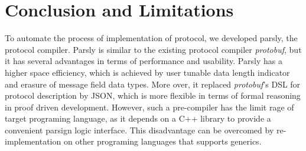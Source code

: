 \documentclass{article}
\begin{document}
\section{Conclusion and Limitations} %
To automate the process of implementation of protocol, we developed parsly, the protocol compiler. Parsly is similar to the existing protocol compiler \textit{protobuf}, but it has several advantages in terms of performance and usability.
Parsly has a higher space efficiency, which is achieved by user tunable data length indicator and erasure of message field data types. More over, it replaced \textit{protobuf}'s DSL for protocol description by JSON, which is more flexible in terms of formal reasoning in proof driven development. 
However, such a pre-compiler has the limit rage of target programing language, as it depends on a C++ library to provide a convenient parsign logic interface. This disadvantage can be overcomed by re-implementation on other programing languages that supports generics.
\end{document}
